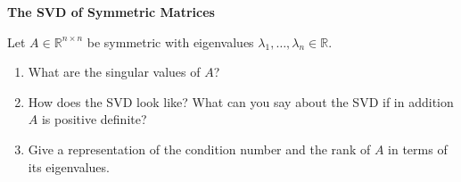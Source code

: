 \textbf{\normalsize The SVD of Symmetric Matrices}

Let $A\in \mathbb{R}^{n\times n}$ be symmetric with eigenvalues $\lambda_1, \ldots, \lambda_n \in \mathbb{R}$.
\begin{enumerate}
	\item What are the singular values of $A$?
	\item How does the SVD look like? What can you say about the SVD if in addition $A$ is positive definite?
	\item Give a representation of the condition number and the rank of $A$ in terms of its eigenvalues.
\end{enumerate} 